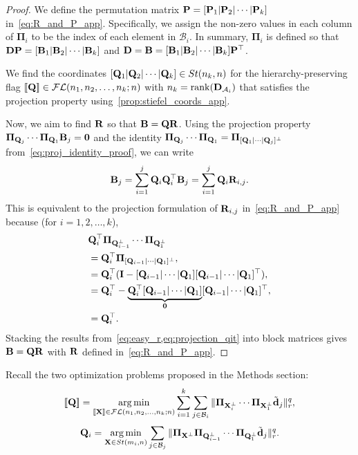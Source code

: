 \begin{proof}
    We define the permutation matrix $\mathbf{P} = [\mathbf{P}_1|\mathbf{P}_2|\cdots |\mathbf{P}_k]$ in~\cref{eq:R_and_P_app}. Specifically, we assign the non-zero values in each column of $\boldsymbol{\Pi}_i$ to be the index of each element in $\mathcal{B}_i$. In summary, $\boldsymbol{\Pi}_i$ is defined so that $\mathbf{D}\mathbf{P}= [\mathbf{B}_1|\mathbf{B}_2|\cdots|\mathbf{B}_k]$ and $\mathbf{D} = \mathbf{B} = [\mathbf{B}_1|\mathbf{B}_2|\cdots|\mathbf{B}_k]\mathbf{P}^\top$.

    We find the coordinates $[\mathbf{Q}_1|\mathbf{Q}_2|\cdots|\mathbf{Q}_k] \in St(n_k,n)$ for the hierarchy-preserving flag $[\![\mathbf{Q}]\!] \in \mathcal{FL}(n_1,n_2,\dots,n_k;n)$ with $n_k = \mathrm{rank}(\mathbf{D}_{\mathcal{A}_i})$ that satisfies the projection property using~\cref{prop:stiefel_coords_app}. 
    
    Now, we aim to find $\mathbf{R}$ so that $\mathbf{B} = \mathbf{Q} \mathbf{R}$. Using the projection property $\boldsymbol{\Pi}_{\mathbf{Q}_j}\cdots\boldsymbol{\Pi}_{\mathbf{Q}_1}\mathbf{B}_j = \bm{0}$ and the identity $\boldsymbol{\Pi}_{\mathbf{Q}_j}\cdots\boldsymbol{\Pi}_{\mathbf{Q}_1} = \boldsymbol{\Pi}_{[\mathbf{Q}_1|\cdots|\mathbf{Q}_j]^\perp}$ from~\cref{eq:proj_identity_proof}, we can write 
    \begin{equation}\label{eq:easy_r}
        \mathbf{B}_j = \sum_{i=1}^j\mathbf{Q}_i \mathbf{Q}_i^\top \mathbf{B}_j =  \sum_{i=1}^j\mathbf{Q}_i\mathbf{R}_{i,j}.
    \end{equation}
    This is equivalent to the projection formulation of $\mathbf{R}_{i,j}$ in~\cref{eq:R_and_P_app} because (for $i=1,2,\dots,k$),
    \begin{align}\label{eq:projection_qit}
    \begin{aligned}
        &\mathbf{Q}_i^\top\boldsymbol{\Pi}_{\mathbf{Q}_{i-1}^\perp}\cdots \boldsymbol{\Pi}_{\mathbf{Q}_1^\perp} \\
        &= \mathbf{Q}_i^\top\boldsymbol{\Pi}_{[\mathbf{Q}_{i-1}| \cdots|\mathbf{Q}_1]^\perp},\\
        &= \mathbf{Q}_i^\top(\mathbf{I} - [\mathbf{Q}_{i-1}| \cdots|\mathbf{Q}_1][\mathbf{Q}_{i-1}| \cdots|\mathbf{Q}_1]^\top),\\
        &= \mathbf{Q}_i^\top - \underbrace{\mathbf{Q}_i^\top [\mathbf{Q}_{i-1}| \cdots|\mathbf{Q}_1]}_{\bm{0}}[\mathbf{Q}_{i-1}| \cdots|\mathbf{Q}_1]^\top,\\
        &= \mathbf{Q}_i^\top. 
        \end{aligned}
    \end{align}
    Stacking the results from~\cref{eq:easy_r,eq:projection_qit} into block matrices gives $\mathbf{B} = \mathbf{Q}\mathbf{R}$ with $\mathbf{R}$ defined in~\cref{eq:R_and_P_app}.
\end{proof}

Recall the two optimization problems proposed in the Methods section:
\begin{equation}\label{eq:general_opt_app}
    [\![\mathbf{Q}]\!] = \operatorname*{arg\min}_{[\![\mathbf{X}]\!] \in \mathcal{FL}(n_1,n_2, \dots, n_k;n)} \sum_{i=1}^k \sum_{j \in \mathcal{B}_i}\| \boldsymbol{\Pi}_{\mathbf{X}_i^\perp} \cdots \boldsymbol{\Pi}_{\mathbf{X}_1^\perp} \tilde{\mathbf{d}}_j \|_r^q,
\end{equation}
\begin{equation}\label{eq:iterative_opt_app}
    \mathbf{Q}_i =  \operatorname*{arg\min}_{\mathbf{X} \in St(m_i,n)} \sum_{j \in \mathcal{B}_j}\| \boldsymbol{\Pi}_{\mathbf{X}^\perp} \boldsymbol{\Pi}_{\mathbf{Q}^\perp_{i-1}} \cdots \boldsymbol{\Pi}_{\mathbf{Q}^\perp_1} \tilde{\mathbf{d}}_j \|_r^q.
\end{equation}


